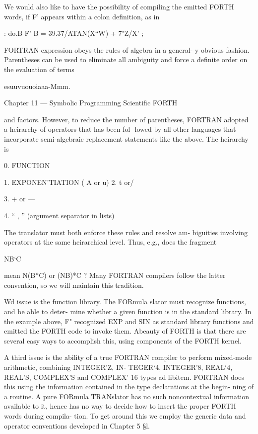 We would also like to have the possibility of compiling the emitted
FORTH words, if F' appears within a colon deﬁnition, as in

: do.B F' B = 39.37/ATAN(X“W) + 7"Z/X' ;

FORTRAN expression obeys the rules of algebra in a general-
y obvious fashion. Parentheses can be used to eliminate all
ambiguity and force a deﬁnite order on the evaluation of terms

esuuvuouoiaaa-Mmm.

Chapter 11 — Symbolic Programming Scientiﬁc FORTH

and factors. However, to reduce the number of parentheses,
FORTRAN adopted a heirarchy of operators that has been fol-
lowed by all other languages that incorporate semi-algebraic
replacement statements like the above. The heirarchy is

0. FUNCTION

1. EXPONEN'TIATION ( A or u)
2. t or/

3. + or —

4. “ , ” (argument separator in lists)

The translator must both enforce these rules and resolve am-
biguities involving operators at the same heirarchical level. Thus,
e.g., does the fragment

NB‘C

mean N(B*C) or (NB)*C ? Many FORTRAN compilers follow
the latter convention, so we will maintain this tradition.

Wd issue is the function library. The FORmula
slator must recognize functions, and be able to deter-
mine whether a given function is in the standard library. In the
example above, F" recognized EXP and SIN as standard library
functions and emitted the FORTH code to invoke them. Abeauty
of FORTH is that there are several easy ways to accomplish this,
using components of the FORTH kernel.

A third issue is the ability of a true FORTRAN compiler to
perform mixed-mode arithmetic, combining INTEGER'Z, IN-
TEGER‘4, INTEGER'8, REAL‘4, REAL'S, COMPLEX'S
and COMPLEX' 16 types ad libitem. FORTRAN does this using
the information contained in the type declarations at the begin-
ning of a routine. A pure FORmula TRANslator has no such
noncontextual information available to it, hence has no way to
decide how to insert the proper FORTH words during compila-
tion. To get around this we employ the generic data and operator
conventions developed in Chapter 5 §l.

